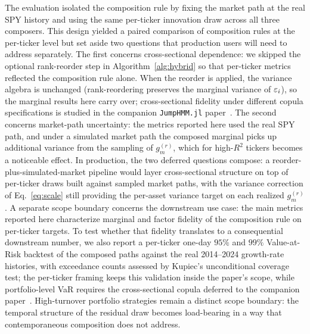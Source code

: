 The evaluation isolated the composition rule by fixing the market
path at the real SPY history and using the
same per-ticker innovation draw across all three composers. This design
yielded a paired comparison of composition rules at the per-ticker level
but set aside two questions that production users will need to address
separately. The first concerns cross-sectional dependence: we skipped
the optional rank-reorder step in Algorithm~\ref{alg:hybrid} so that
per-ticker metrics reflected the composition rule alone. When the
reorder is applied, the variance algebra is unchanged
(rank-reordering preserves the marginal variance of $\varepsilon_i$), so the
marginal results here carry over; cross-sectional fidelity under
different copula specifications is studied in the companion
\texttt{JumpHMM.jl} paper~\cite{alswaidanVarner2026jdiq}. The second
concerns market-path uncertainty: the metrics reported here used the
real SPY path, and under a simulated market path the composed
marginal picks up additional variance from the sampling of
$g_m^{(r)}$, which for high-$R^2$ tickers becomes a noticeable
effect. In production, the two deferred questions compose:
a reorder-plus-simulated-market pipeline would layer cross-sectional
structure on top of per-ticker draws built against sampled market
paths, with the variance correction of Eq.~\eqref{eq:scale} still
providing the per-asset variance target on each realized
$g_m^{(r)}$. A separate scope boundary concerns the downstream use
case: the main metrics reported here characterize marginal and
factor fidelity of the composition rule on per-ticker targets. To
test whether that fidelity translates to a consequential downstream
number, we also report a per-ticker one-day $95\%$ and $99\%$
Value-at-Risk backtest of the composed paths against the real
2014--2024 growth-rate histories, with exceedance counts assessed by
Kupiec's unconditional coverage test; the per-ticker framing keeps
this validation inside the paper's scope, while portfolio-level VaR
requires the cross-sectional copula deferred to the companion
paper~\cite{alswaidanVarner2026jdiq}. High-turnover portfolio
strategies remain a distinct scope boundary: the temporal structure
of the residual draw becomes load-bearing in a way that
contemporaneous composition does not address.

